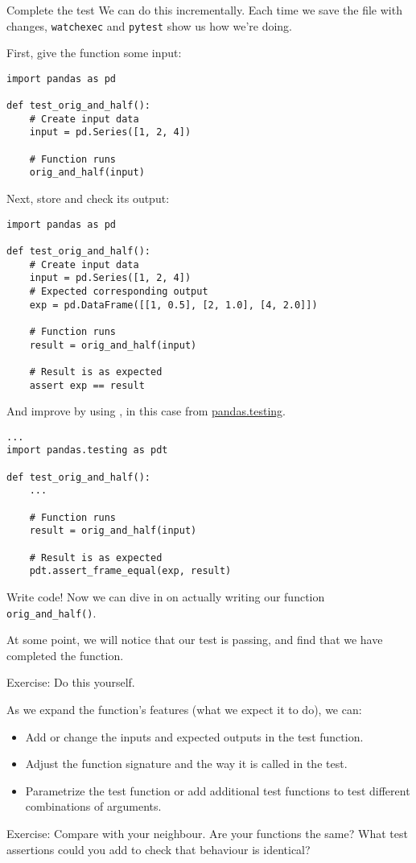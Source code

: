 \documentclass[12pt,aspectratio=169]{beamer}
\begin{document}
\begin{frame}{Complete the test}
We can do this incrementally.
Each time we save the file with changes, \verb|watchexec| and \verb|pytest| show us how we're doing.

\medskip
First, give the function some input:
\begin{verbatim}
import pandas as pd

def test_orig_and_half():
    # Create input data
    input = pd.Series([1, 2, 4])
    
    # Function runs
    orig_and_half(input)
\end{verbatim}

\framebreak
Next, store and check its output:
\begin{verbatim}
import pandas as pd

def test_orig_and_half():
    # Create input data
    input = pd.Series([1, 2, 4])
    # Expected corresponding output
    exp = pd.DataFrame([[1, 0.5], [2, 1.0], [4, 2.0]])
    
    # Function runs
    result = orig_and_half(input)

    # Result is as expected
    assert exp == result
\end{verbatim}

\framebreak
And improve by using , in this case from \href{https://pandas.pydata.org/pandas-docs/stable/reference/api/pandas.testing.assert_frame_equal.html}{pandas.testing}.

\begin{verbatim}
...
import pandas.testing as pdt

def test_orig_and_half():
    ...
    
    # Function runs
    result = orig_and_half(input)

    # Result is as expected
    pdt.assert_frame_equal(exp, result)
\end{verbatim}
\end{frame}

\begin{frame}{Write code!}
Now we can dive in on actually writing our function \texttt{orig_and_half()}.

\medskip
At some point, we will notice that our test is passing, and find that we have completed the function.

\smallskip
Exercise: Do this yourself.

\medskip
As we expand the function's features (what we expect it to do), we can:
\begin{itemize}
  \item Add or change the inputs and expected outputs in the test function.
  \item Adjust the function signature and the way it is called in the test.
  \item Parametrize the test function or add additional test functions to test different combinations of arguments.
\end{itemize}
\pause\smallskip
Exercise: Compare with your neighbour. Are your functions the same? What test assertions could you add to check that behaviour is identical?
\end{frame}
\end{document}

